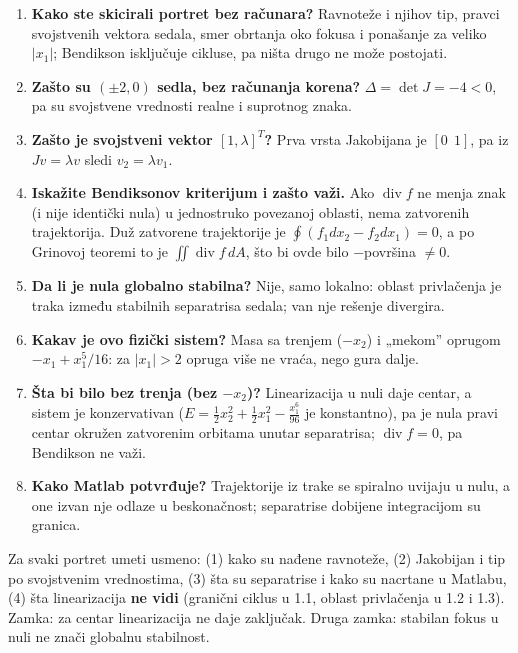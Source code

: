 \documentclass[11pt,a4paper,parskip=half,headsepline,numbers=noenddot]{scrartcl}
\begin{document}
\begin{enumerate}
\def\labelenumi{\arabic{enumi}.}
\item \textbf{Kako ste skicirali portret bez računara?} Ravnoteže i njihov tip, pravci svojstvenih vektora sedala, smer obrtanja oko fokusa i ponašanje za veliko \(|x_1|\); Bendikson isključuje cikluse, pa ništa drugo ne može postojati.
\item \textbf{Zašto su \((\pm2, 0)\) sedla, bez računanja korena?} \(\Delta = \det J = -4 < 0\), pa su svojstvene vrednosti realne i suprotnog znaka.
\item \textbf{Zašto je svojstveni vektor \([1, \lambda]^T\)?} Prva vrsta Jakobijana je \([0\ \ 1]\), pa iz \(Jv = \lambda v\) sledi \(v_2 = \lambda v_1\).
\item \textbf{Iskažite Bendiksonov kriterijum i zašto važi.} Ako \(\operatorname{div} f\) ne menja znak (i nije identički nula) u jednostruko povezanoj oblasti, nema zatvorenih trajektorija. Duž zatvorene trajektorije je \(\oint(f_1dx_2 - f_2dx_1) = 0\), a po Grinovoj teoremi to je \(\iint\operatorname{div} f\,dA\), što bi ovde bilo \(-\)površina \(\ne 0\).
\item \textbf{Da li je nula globalno stabilna?} Nije, samo lokalno: oblast privlačenja je traka između stabilnih separatrisa sedala; van nje rešenje divergira.
\item \textbf{Kakav je ovo fizički sistem?} Masa sa trenjem (\(-x_2\)) i „mekom'' oprugom \(-x_1 + x_1^5/16\): za \(|x_1| > 2\) opruga više ne vraća, nego gura dalje.
\item \textbf{Šta bi bilo bez trenja (bez \(-x_2\))?} Linearizacija u nuli daje centar, a sistem je konzervativan (\(E = \frac12x_2^2 + \frac12x_1^2 - \frac{x_1^6}{96}\) je konstantno), pa je nula pravi centar okružen zatvorenim orbitama unutar separatrisa; \(\operatorname{div} f = 0\), pa Bendikson ne važi.
\item \textbf{Kako Matlab potvrđuje?} Trajektorije iz trake se spiralno uvijaju u nulu, a one izvan nje odlaze u beskonačnost; separatrise dobijene integracijom su granica.
\end{enumerate}

\begin{ispit}
Za svaki portret umeti usmeno: (1) kako su nađene ravnoteže, (2) Jakobijan i tip po svojstvenim vrednostima, (3) šta su separatrise i kako su nacrtane u Matlabu, (4) šta linearizacija \textbf{ne vidi} (granični ciklus u 1.1, oblast privlačenja u 1.2 i 1.3). Zamka: za centar linearizacija ne daje zaključak. Druga zamka: stabilan fokus u nuli ne znači globalnu stabilnost.
\end{ispit}
\end{document}
